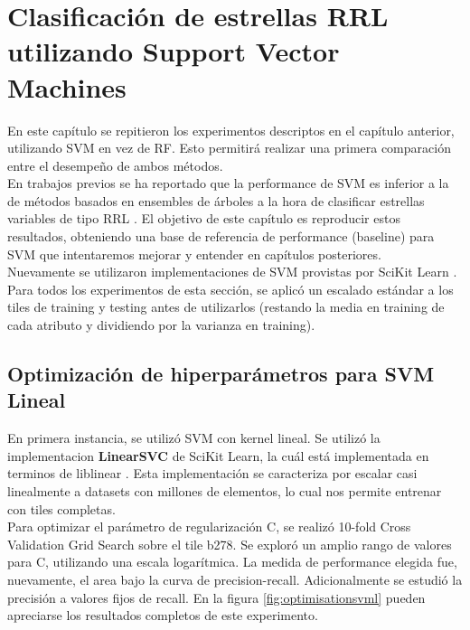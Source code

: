 \chapter{Clasificación de estrellas RRL utilizando Support Vector Machines}

En este capítulo se repitieron los experimentos descriptos en el capítulo anterior, utilizando SVM en vez de RF. Esto permitirá realizar una primera comparación entre el desempeño de ambos métodos. \\

En trabajos previos se ha reportado que la performance de SVM es inferior a la de métodos basados en ensembles de árboles a la hora de clasificar estrellas variables de tipo RRL \cite{jbc} \cite{elorrieta}. El objetivo de este capítulo es reproducir estos resultados, obteniendo una base de referencia de performance (baseline) para SVM que intentaremos mejorar y entender en capítulos posteriores. \\

Nuevamente se utilizaron implementaciones de SVM provistas por SciKit Learn\cite{sklearn_api} \cite{pedregosa2011scikit}. Para todos los experimentos de esta sección, se aplicó un escalado estándar a los tiles de training y testing antes de utilizarlos (restando la media en training de cada atributo y dividiendo por la varianza en training).

\section{Optimización de hiperparámetros para SVM Lineal}

En primera instancia, se utilizó SVM con kernel lineal. Se utilizó la implementacion \textbf{LinearSVC} de SciKit Learn, la cuál está implementada en terminos de liblinear \cite{liblinear}. Esta implementación se caracteriza por escalar casi linealmente a datasets con millones de elementos, lo cual nos permite entrenar con tiles completas. \\

Para optimizar el parámetro de regularización C, se realizó 10-fold Cross Validation Grid Search sobre el tile b278. Se exploró un amplio rango de valores para C, utilizando una escala logarítmica. La medida de performance elegida fue, nuevamente, el area bajo la curva de precision-recall. Adicionalmente se estudió la precisión a valores fijos de recall. En la figura \ref{fig:optimisationsvml} pueden apreciarse los resultados completos de este experimento. \\ 

